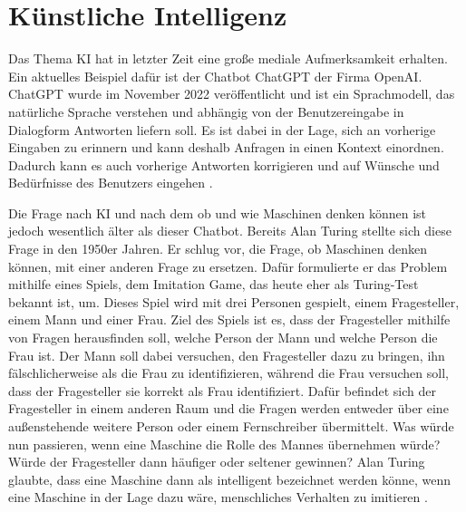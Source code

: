 \section{Künstliche Intelligenz}
\label{chap:KI}

Das Thema \ac{KI} hat in letzter Zeit eine große mediale Aufmerksamkeit erhalten. Ein aktuelles Beispiel dafür ist der Chatbot ChatGPT der Firma OpenAI.
ChatGPT wurde im November 2022 veröffentlicht und ist ein Sprachmodell, das natürliche Sprache verstehen und abhängig von der 
Benutzereingabe in Dialogform Antworten liefern soll. Es ist dabei in der Lage, sich an vorherige Eingaben zu erinnern und kann 
deshalb Anfragen in einen Kontext einordnen. Dadurch kann es auch vorherige Antworten korrigieren und auf Wünsche und Bedürfnisse 
des Benutzers eingehen \cite[]{CHATGPT}. 

Die Frage nach \ac{KI} und nach dem ob und wie Maschinen denken können ist jedoch wesentlich älter als dieser Chatbot. 
Bereits Alan Turing stellte sich diese Frage in den 1950er Jahren. Er schlug vor, die Frage, ob Maschinen denken können,
mit einer anderen Frage zu ersetzen. Dafür formulierte er das Problem mithilfe eines Spiels, dem \glqq Imitation Game\grqq{}, 
das heute eher als Turing-Test bekannt ist, um. Dieses Spiel wird mit drei Personen gespielt, einem Fragesteller, einem Mann und 
einer Frau. Ziel des Spiels ist es, dass der Fragesteller mithilfe von Fragen herausfinden soll, welche Person der Mann und welche Person 
die Frau ist. Der Mann soll dabei versuchen, den Fragesteller dazu zu bringen, ihn fälschlicherweise als die Frau zu identifizieren, während die Frau versuchen soll, 
dass der Fragesteller sie korrekt als Frau identifiziert. Dafür befindet sich der Fragesteller in einem anderen Raum und die Fragen werden entweder 
über eine außenstehende weitere Person oder einem Fernschreiber übermittelt. Was würde nun passieren, wenn eine Maschine die Rolle des Mannes übernehmen würde?
Würde der Fragesteller dann häufiger oder seltener gewinnen? Alan Turing glaubte, dass eine Maschine dann als
intelligent bezeichnet werden könne, wenn eine Maschine in der Lage dazu wäre, menschliches Verhalten zu imitieren \cite[vgl. S.433f.]{TURING}.

